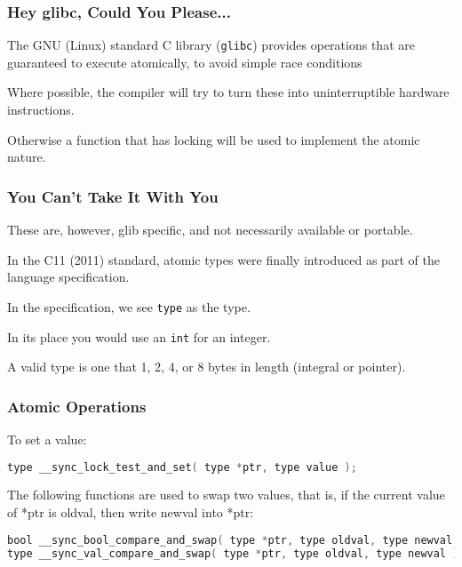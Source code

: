 \begin{frame}
	\frametitle{Hey glibc, Could You Please...}

The GNU (Linux) standard C library (\texttt{glibc}) provides operations that are guaranteed to execute atomically, to avoid simple race conditions

	Where possible, the compiler will try to turn these into uninterruptible hardware instructions.
	
	Otherwise a function that has locking will be used to implement the atomic nature.
\end{frame}

\begin{frame}
	\frametitle{You Can't Take It With You}
	
	These are, however, glib specific, and not necessarily available or portable.
	
	In the C11 (2011) standard, atomic types were finally introduced as part of the language specification. 
	
	In the specification, we see \texttt{type} as the type.
	
	In its place you would use an \texttt{int} for an integer. 
	
	A valid type is one that 1, 2, 4, or 8 bytes in length (integral or pointer).

\end{frame}


\begin{frame}[fragile]
	\frametitle{Atomic Operations}

To set a value:
\begin{lstlisting}[language=C]
type __sync_lock_test_and_set( type *ptr, type value );
\end{lstlisting}


The following functions are used to swap two values, that is, if the current value of *ptr is oldval, then write newval into *ptr:

\begin{lstlisting}[language=C]
bool __sync_bool_compare_and_swap( type *ptr, type oldval, type newval );
type __sync_val_compare_and_swap( type *ptr, type oldval, type newval );
\end{lstlisting}


\end{frame}


